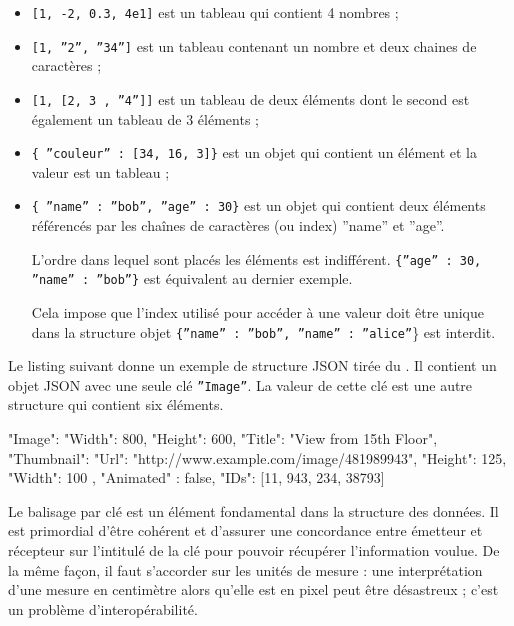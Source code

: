 \begin{itemize}
    \item \texttt{[1, -2, 0.3, 4e1]} est un tableau qui contient 4 nombres ;
    \item \texttt{[1, ”2”, ”34”]} est un tableau contenant un nombre et deux chaines de caractères ;
    \item \texttt{[1, [2, 3 , ”4”]]} est un tableau de deux éléments dont le second est également un tableau de 3 éléments ;
    \item \texttt{\{ ”couleur” : [34, 16, 3]\}} est un objet qui contient un élément et la valeur est un tableau ; 
    \item \texttt{\{ ”name” : ”bob”, ”age” : 30\}} est un objet qui contient deux éléments référencés par les chaînes de caractères (ou index)  ”name” et ”age”.
    
    L’ordre dans lequel sont placés les éléments est indifférent. \texttt{\{”age” : 30, ”name” : ”bob”\}} est équivalent au dernier exemple. 

    Cela impose que l’index utilisé pour accéder à une valeur doit être unique dans la structure objet \texttt{\{”name” : ”bob”, ”name” : ”alice”}\} est interdit.
\end{itemize}

     \vspace{1em}

Le listing suivant donne un exemple de structure JSON tirée du . Il contient un objet JSON avec une seule clé \texttt{”Image”}. La valeur de cette clé est une autre structure qui contient six éléments. 

\begin{termc}[backgroundcolor=\color{gray!10}, language=json]
{
"Image": {
      "Width": 800,
      "Height": 600,
      "Title": "View from 15th Floor",
      "Thumbnail": {   
           "Url": "http://www.example.com/image/481989943",
           "Height": 125,
           "Width": 100
       },
       "Animated" : false,
       "IDs": [11, 943, 234, 38793]
    }
}
\end{termc}

Le balisage par clé est un élément fondamental dans la structure des données. Il est primordial d'être cohérent et d'assurer une concordance entre émetteur et récepteur sur l'intitulé de la clé pour pouvoir récupérer l'information voulue. De la même façon, il faut s'accorder sur les unités de mesure : une interprétation d'une mesure en centimètre alors qu'elle est en pixel peut être désastreux ; c'est un problème d'interopérabilité.
     \vspace{1em}

